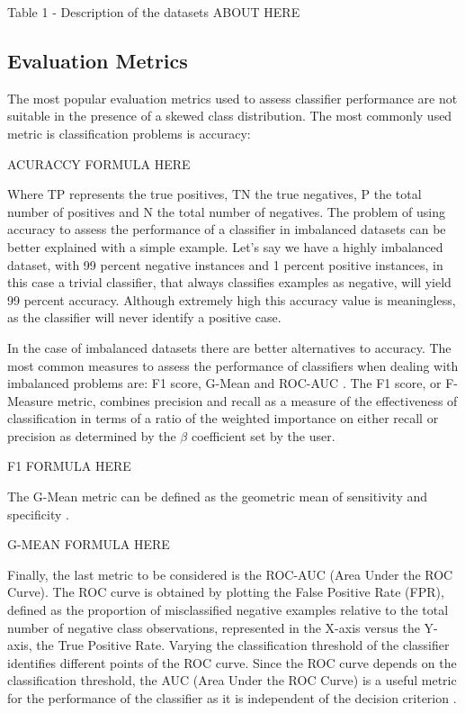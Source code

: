 \documentclass[parskip=full]{scrartcl}
\begin{document}
Table 1 - Description of the datasets ABOUT HERE

\subsection{Evaluation Metrics}

The most popular evaluation metrics used to assess classifier performance are
not suitable in the presence of a skewed class distribution. The most commonly
used metric is classification problems is accuracy:

ACURACCY FORMULA HERE

Where TP represents the true positives, TN the true negatives, P the total
number of positives and N the total number of negatives. The problem of using
accuracy to assess the performance of a classifier in imbalanced datasets can be
better explained with a simple example. Let’s say we have a highly imbalanced
dataset, with 99 percent negative instances and 1 percent positive instances, in
this case a trivial classifier, that always classifies examples as negative,
will yield 99 percent accuracy. Although extremely high this accuracy value is
meaningless, as the classifier will never identify a positive case.

In the case of imbalanced datasets there are better alternatives to accuracy.
The most common measures to assess the performance of classifiers when dealing
with imbalanced problems are: F1 score, G-Mean and ROC-AUC \cite{He2009}. The F1
score, or F-Measure metric, combines precision and recall as a measure of the
effectiveness of classification in terms of a ratio of the weighted importance
on either recall or precision as determined by the $\beta$ coefficient set by
the user.

F1 FORMULA HERE

The G-Mean metric can be defined as the geometric mean of sensitivity and
specificity \cite{He2009}.

G-MEAN FORMULA HERE

Finally, the last metric to be considered is the ROC-AUC (Area Under the ROC
Curve). The ROC curve is obtained by plotting the False Positive Rate (FPR),
defined as the proportion of misclassified negative examples relative to the
total number of negative class observations, represented in the X-axis versus
the Y-axis, the True Positive Rate. Varying the classification threshold of the
classifier identifies different points of the ROC curve. Since the ROC curve
depends on the classification threshold, the AUC (Area Under the ROC Curve) is a
useful metric for the performance of the classifier as it is independent of the
decision criterion \cite{He2009}.
\end{document}
